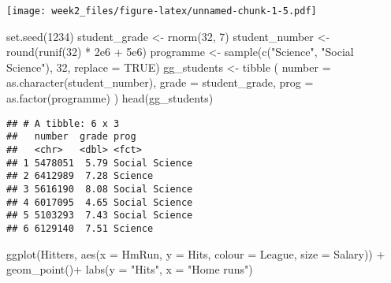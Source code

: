 \documentclass[
]{article}
\newenvironment{Shaded}{\begin{snugshade}}{\end{snugshade}}
\newcommand{\AttributeTok}[1]{\textcolor[rgb]{0.77,0.63,0.00}{#1}}
\newcommand{\ConstantTok}[1]{\textcolor[rgb]{0.00,0.00,0.00}{#1}}
\newcommand{\DecValTok}[1]{\textcolor[rgb]{0.00,0.00,0.81}{#1}}
\newcommand{\FloatTok}[1]{\textcolor[rgb]{0.00,0.00,0.81}{#1}}
\newcommand{\FunctionTok}[1]{\textcolor[rgb]{0.00,0.00,0.00}{#1}}
\newcommand{\NormalTok}[1]{#1}
\newcommand{\OtherTok}[1]{\textcolor[rgb]{0.56,0.35,0.01}{#1}}
\newcommand{\SpecialCharTok}[1]{\textcolor[rgb]{0.00,0.00,0.00}{#1}}
\newcommand{\StringTok}[1]{\textcolor[rgb]{0.31,0.60,0.02}{#1}}
\begin{document}
\texttt{[image: week2\_files/figure-latex/unnamed-chunk-1-5.pdf]}

\begin{Shaded}
\begin{Highlighting}[]
  \FunctionTok{set.seed}\NormalTok{(}\DecValTok{1234}\NormalTok{)}
\NormalTok{  student\_grade  }\OtherTok{\textless{}{-}} \FunctionTok{rnorm}\NormalTok{(}\DecValTok{32}\NormalTok{, }\DecValTok{7}\NormalTok{)}
\NormalTok{  student\_number }\OtherTok{\textless{}{-}} \FunctionTok{round}\NormalTok{(}\FunctionTok{runif}\NormalTok{(}\DecValTok{32}\NormalTok{) }\SpecialCharTok{*} \FloatTok{2e6} \SpecialCharTok{+} \FloatTok{5e6}\NormalTok{)}
\NormalTok{  programme      }\OtherTok{\textless{}{-}} \FunctionTok{sample}\NormalTok{(}\FunctionTok{c}\NormalTok{(}\StringTok{"Science"}\NormalTok{, }\StringTok{"Social Science"}\NormalTok{), }\DecValTok{32}\NormalTok{, }\AttributeTok{replace =} \ConstantTok{TRUE}\NormalTok{)}
\NormalTok{  gg\_students }\OtherTok{\textless{}{-}} \FunctionTok{tibble}\NormalTok{ ( }\AttributeTok{number =} \FunctionTok{as.character}\NormalTok{(student\_number), }
    \AttributeTok{grade  =}\NormalTok{ student\_grade,                }
    \AttributeTok{prog   =} \FunctionTok{as.factor}\NormalTok{(programme)         }
\NormalTok{ )}
  \FunctionTok{head}\NormalTok{(gg\_students)}
\end{Highlighting}
\end{Shaded}

\begin{verbatim}
## # A tibble: 6 x 3
##   number  grade prog          
##   <chr>   <dbl> <fct>         
## 1 5478051  5.79 Social Science
## 2 6412989  7.28 Science       
## 3 5616190  8.08 Social Science
## 4 6017095  4.65 Social Science
## 5 5103293  7.43 Social Science
## 6 6129140  7.51 Science
\end{verbatim}

\begin{Shaded}
\begin{Highlighting}[]
  \FunctionTok{ggplot}\NormalTok{(Hitters, }\FunctionTok{aes}\NormalTok{(}\AttributeTok{x =}\NormalTok{ HmRun, }\AttributeTok{y =}\NormalTok{ Hits, }\AttributeTok{colour =}\NormalTok{  League, }\AttributeTok{size =}\NormalTok{ Salary)) }\SpecialCharTok{+} \FunctionTok{geom\_point}\NormalTok{()}\SpecialCharTok{+} \FunctionTok{labs}\NormalTok{(}\AttributeTok{y =} \StringTok{"Hits"}\NormalTok{, }\AttributeTok{x =} \StringTok{"Home runs"}\NormalTok{)}
\end{Highlighting}
\end{Shaded}
\end{document}
